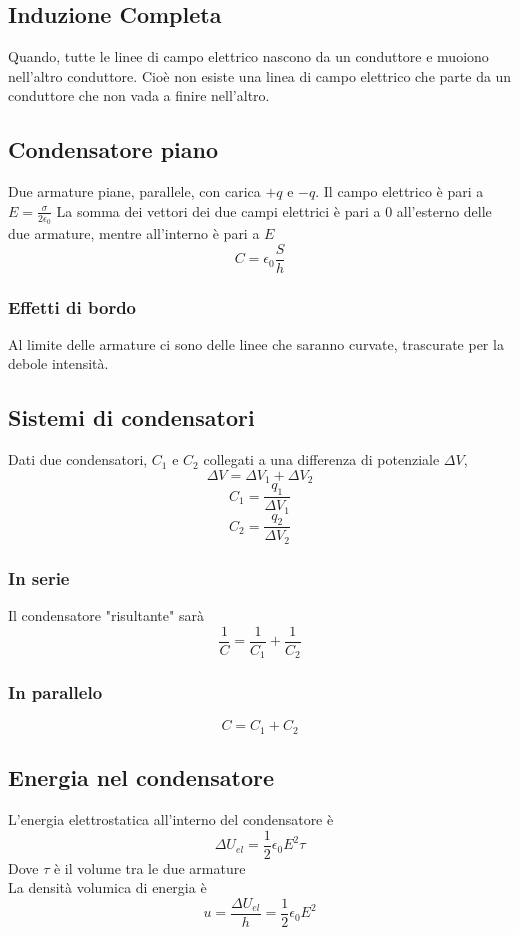 \documentclass[a4paper]{report}
\begin{document}
  \subsection{Induzione Completa}
  Quando, tutte le linee di campo elettrico nascono da un conduttore e muoiono nell'altro conduttore. Cioè non esiste una linea di campo elettrico che parte da un conduttore che non vada a finire nell'altro.

  \subsection{Condensatore piano}
  Due armature piane, parallele, con carica $+q$ e $-q$.
  Il campo elettrico è pari a \( E = \frac{\sigma}{2\epsilon_0} \)
  La somma dei vettori dei due campi elettrici è pari a $0$ all'esterno delle due armature, mentre all'interno è pari a $E$
  $$ C = \epsilon_0 \frac{S}{h} $$

  \subsubsection{Effetti di bordo}
  Al limite delle armature ci sono delle linee che saranno curvate, trascurate per la debole intensità.

  \subsection{Sistemi di condensatori}
  Dati due condensatori, $C_1$ e $C_2$ collegati a una differenza di potenziale $\Delta V$,
  $$ \Delta V = \Delta V_1 + \Delta V_2 $$
  $$ C_1 = \frac{q_1}{\Delta V_1} $$
  $$ C_2 = \frac{q_2}{\Delta V_2} $$

  \subsubsection{In serie}
  Il condensatore "risultante" sarà
  $$ \frac{1}{C} = \frac{1}{C_1} + \frac{1}{C_2} $$

  \subsubsection{In parallelo}
  $$ C = C_1 + C_2 $$

  \subsection{Energia nel condensatore}
  L'energia elettrostatica all'interno del condensatore è
  $$ \Delta U_{el} = \frac{1}{2} \epsilon_0 E^2 \tau $$
  Dove $\tau$ è il volume tra le due armature\\
  La densità volumica di energia è
  $$ u = \frac{\Delta U_{el}}{h} = \frac{1}{2} \epsilon_0 E^2 $$
\end{document}

